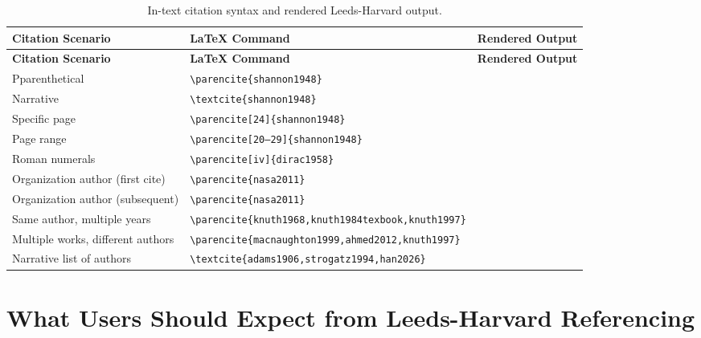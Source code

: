 \documentclass[a4paper,11pt]{article}
\begin{document}
\begingroup
\small
\begin{longtable}{@{} >{\raggedright}p{3.8cm} >{\raggedright}p{6.4cm} >{\raggedright\arraybackslash}p{4.8cm} @{}}
\caption{In-text citation syntax and rendered Leeds-Harvard output.} \label{tab:citations} \\
\toprule
\textbf{Citation Scenario} & \textbf{\LaTeX{} Command} & \textbf{Rendered Output} \\
\midrule
\endfirsthead
\toprule
\textbf{Citation Scenario} & \textbf{\LaTeX{} Command} & \textbf{Rendered Output} \\
\midrule
\endhead
\bottomrule
\endfoot
Pparenthetical & \texttt{\textbackslash parencite\{shannon1948\}} & \parencite{shannon1948} \\
Narrative & \texttt{\textbackslash textcite\{shannon1948\}} & \textcite{shannon1948} \\
Specific page & \texttt{\textbackslash parencite[24]\{shannon1948\}} & \parencite[24]{shannon1948} \\
Page range & \texttt{\textbackslash parencite[20--29]\{shannon1948\}} & \parencite[20--29]{shannon1948} \\
Roman numerals & \texttt{\textbackslash parencite[iv]\{dirac1958\}} & \parencite[iv]{dirac1958} \\
Organization author (first cite) & \texttt{\textbackslash parencite\{nasa2011\}} & \parencite{nasa2011} \\
Organization author (subsequent) & \texttt{\textbackslash parencite\{nasa2011\}} & \parencite{nasa2011} \\
Same author, multiple years & \texttt{\textbackslash parencite\{knuth1968,}\allowbreak\texttt{knuth1984texbook,}\allowbreak\texttt{knuth1997\}} & \parencite{knuth1968,knuth1984texbook,knuth1997} \\
Multiple works, different authors & \texttt{\textbackslash parencite\{macnaughton1999,}\allowbreak\texttt{ahmed2012,knuth1997\}} & \parencite{macnaughton1999,ahmed2012,knuth1997} \\
Narrative list of authors & \texttt{\textbackslash textcite\{adams1906,}\allowbreak\texttt{strogatz1994,han2026\}} & \textcite{adams1906,strogatz1994,han2026} \\
\bottomrule
\end{longtable}
\endgroup

\section{What Users Should Expect from Leeds-Harvard Referencing}
\end{document}
